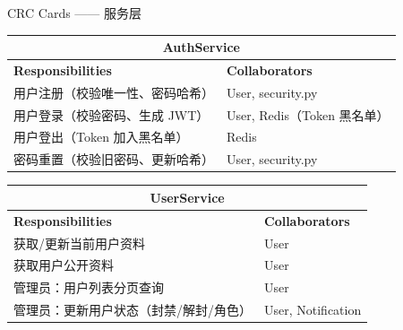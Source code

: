 \documentclass[aspectratio=169,UTF8]{ctexbeamer}
\begin{document}
\begin{frame}{CRC Cards —— 服务层}
    \small
    \centering
    \begin{tabular}{|p{4.8cm}|p{4.8cm}|}
        \hline
        \multicolumn{2}{|c|}{\textbf{AuthService}} \\
        \hline
        \textbf{Responsibilities} & \textbf{Collaborators} \\
        \hline
        用户注册（校验唯一性、密码哈希） & User, security.py \\
        用户登录（校验密码、生成 JWT） & User, Redis（Token 黑名单） \\
        用户登出（Token 加入黑名单） & Redis \\
        密码重置（校验旧密码、更新哈希） & User, security.py \\
        \hline
    \end{tabular}
    \vspace{0.3cm}

    \begin{tabular}{|p{4.8cm}|p{4.8cm}|}
        \hline
        \multicolumn{2}{|c|}{\textbf{UserService}} \\
        \hline
        \textbf{Responsibilities} & \textbf{Collaborators} \\
        \hline
        获取/更新当前用户资料 & User \\
        获取用户公开资料 & User \\
        管理员：用户列表分页查询 & User \\
        管理员：更新用户状态（封禁/解封/角色） & User, Notification \\
        \hline
    \end{tabular}
\end{frame}
\end{document}
